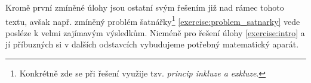 Kromě první zmíněné úlohy jsou ostatní svým řešením již nad rámec tohoto textu, avšak např. zmíněný problém šatnářky\footnote{Konkrétně zde se při řešení využije tzv. \emph{princip inkluze a exkluze}.} \ref{exercise:problem_satnarky} vede posléze k velmi zajímavým výsledkům. Nicméně pro řešení úlohy \ref{exercise:intro} a jí příbuzných si v dalších odstavcích vybudujeme potřebný matematický aparát.\par